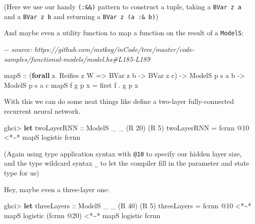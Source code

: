 \documentclass[]{article}
\newenvironment{Shaded}{}{}
\newcommand{\CommentTok}[1]{\textcolor[rgb]{0.38,0.63,0.69}{\textit{#1}}}
\newcommand{\DataTypeTok}[1]{\textcolor[rgb]{0.56,0.13,0.00}{#1}}
\newcommand{\DecValTok}[1]{\textcolor[rgb]{0.25,0.63,0.44}{#1}}
\newcommand{\KeywordTok}[1]{\textcolor[rgb]{0.00,0.44,0.13}{\textbf{#1}}}
\newcommand{\NormalTok}[1]{#1}
\newcommand{\OperatorTok}[1]{\textcolor[rgb]{0.40,0.40,0.40}{#1}}
\newcommand{\OtherTok}[1]{\textcolor[rgb]{0.00,0.44,0.13}{#1}}
\begin{document}
(Here we use our handy \texttt{(:\&\&)} pattern to construct a tuple, taking a
\texttt{BVar\ z\ a} and a \texttt{BVar\ z\ b} and returning a
\texttt{BVar\ z\ (a\ :\&\ b)})

And maybe even a utility function to map a function on the result of a
\texttt{ModelS}:

\begin{Shaded}
\begin{Highlighting}[]
\CommentTok{{-}{-} source: https://github.com/mstksg/inCode/tree/master/code{-}samples/functional{-}models/model.hs\#L185{-}L189}

\NormalTok{mapS}
\OtherTok{    ::}\NormalTok{ (}\KeywordTok{forall}\NormalTok{ z}\OperatorTok{.} \DataTypeTok{Reifies}\NormalTok{ z }\DataTypeTok{W} \OtherTok{=>} \DataTypeTok{BVar}\NormalTok{ z b }\OtherTok{{-}>} \DataTypeTok{BVar}\NormalTok{ z c)}
    \OtherTok{{-}>} \DataTypeTok{ModelS}\NormalTok{ p s a b}
    \OtherTok{{-}>} \DataTypeTok{ModelS}\NormalTok{ p s a c}
\NormalTok{mapS f g p x }\OtherTok{=}\NormalTok{ first f }\OperatorTok{.}\NormalTok{ g p x}
\end{Highlighting}
\end{Shaded}

With this we can do some neat things like define a two-layer fully-connected
recurrent neural network.

\begin{Shaded}
\begin{Highlighting}[]
\NormalTok{ghci}\OperatorTok{>} \KeywordTok{let}\OtherTok{ twoLayerRNN ::} \DataTypeTok{ModelS}\NormalTok{ \_ \_ (}\DataTypeTok{R} \DecValTok{20}\NormalTok{) (}\DataTypeTok{R} \DecValTok{5}\NormalTok{)}
\NormalTok{          twoLayerRNN }\OtherTok{=}\NormalTok{ fcrnn }\OperatorTok{@}\DecValTok{10} \OperatorTok{<*\textasciitilde{}*}\NormalTok{ mapS logistic fcrnn}
\end{Highlighting}
\end{Shaded}

(Again using type application syntax with \texttt{@10} to specify our hidden
layer size, and the type wildcard syntax \texttt{\_} to let the compiler fill in
the parameter and state type for us)

Hey, maybe even a three-layer one:

\begin{Shaded}
\begin{Highlighting}[]
\NormalTok{ghci}\OperatorTok{>} \KeywordTok{let}\OtherTok{ threeLayers ::} \DataTypeTok{ModelS}\NormalTok{ \_ \_ (}\DataTypeTok{R} \DecValTok{40}\NormalTok{) (}\DataTypeTok{R} \DecValTok{5}\NormalTok{)}
\NormalTok{          threeLayers }\OtherTok{=}\NormalTok{ fcrnn }\OperatorTok{@}\DecValTok{10}
                   \OperatorTok{<*\textasciitilde{}*}\NormalTok{ mapS logistic (fcrnn }\OperatorTok{@}\DecValTok{20}\NormalTok{)}
                   \OperatorTok{<*\textasciitilde{}*}\NormalTok{ mapS logistic fcrnn}
\end{Highlighting}
\end{Shaded}
\end{document}
